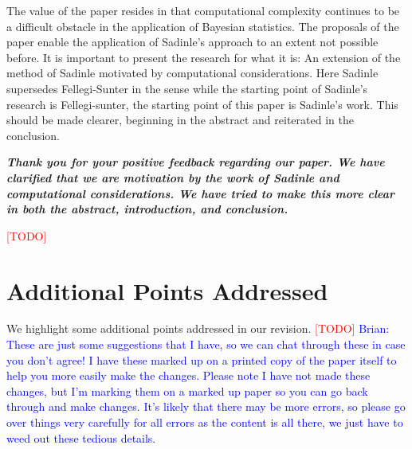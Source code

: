 \documentclass[letterpaper, parskip]{scrartcl}
\newcounter{responsectr}[section]     %
\newcommand{\reply}[1]{%
	\refstepcounter{responsectr}%
		\begin{tcolorbox}
			\itshape #1
		\end{tcolorbox}
}
\newcommand{\todo}{\textcolor{red}{[TODO]}\xspace}
\begin{document}
	
	
	The value of the paper resides in that computational complexity continues to be a difficult obstacle in the application of Bayesian statistics. The proposals of the paper enable the application of Sadinle’s approach to an extent not possible before. It is important to present the research for what it is: An extension of the method of Sadinle motivated by computational considerations. Here Sadinle supersedes Fellegi-Sunter in the sense while the starting point of Sadinle’s research is Fellegi-sunter, the starting point of this paper is Sadinle’s work. This should be made clearer, beginning in the abstract and reiterated in the conclusion.

	\reply{%
	\textbf{Thank you for your positive feedback regarding our paper. We have clarified that we are motivation by the work of Sadinle and computational considerations. We have tried to make this more clear in both the abstract, introduction, and conclusion.}} \todo
		

\newpage

\section{Additional Points Addressed}

We highlight some additional points addressed in our revision. \todo
\textcolor{blue}{Brian: These are just some suggestions that I have, so we can chat through these in case you don't agree! I have these marked up on a printed copy of the paper itself to help you more easily make the changes. Please note I have not made these changes, but I'm marking them on a marked up paper so you can go back through and make changes. It's likely that there may be more errors, so please go over things very carefully for all errors as the content is all there, we just have to weed out these tedious details.}
\end{document}
